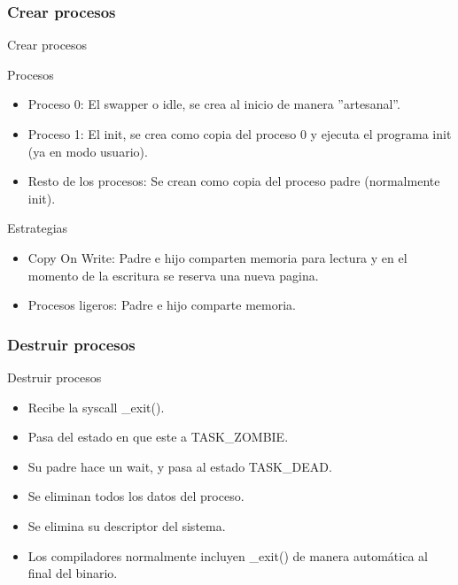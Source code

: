 \subsubsection{Crear procesos}
\begin{frame}{Crear procesos}
	\begin{block}{Procesos}
		\begin{itemize}
			\item Proceso 0: El swapper o idle, se crea al inicio de manera ''artesanal''.
			\item Proceso 1: El init, se crea como copia del proceso 0 y ejecuta el programa init (ya en modo usuario).
			\item Resto de los procesos: Se crean como copia del proceso padre (normalmente init).
		\end{itemize}
	\end{block}
	\begin{block}{Estrategias}
		\begin{itemize}
			\item Copy On Write: Padre e hijo comparten memoria para lectura y en el momento de la escritura se reserva una nueva pagina.
			\item Procesos ligeros: Padre e hijo comparte memoria.
		\end{itemize}
	\end{block}
\end{frame}

\subsubsection{Destruir procesos}
\begin{frame}{Destruir procesos}
	\begin{itemize}
		\item Recibe la syscall \_exit().
		\item Pasa del estado en que este a TASK\_ZOMBIE.
		\item Su padre hace un wait, y pasa al estado TASK\_DEAD.
		\item Se eliminan todos los datos del proceso.
		\item Se elimina su descriptor del sistema.
		\item Los compiladores normalmente incluyen \_exit() de manera automática al final del binario.
	\end{itemize}
\end{frame}

